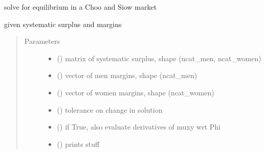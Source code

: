\documentclass[letterpaper,10pt,english]{sphinxmanual}
\begin{document}

\begin{fulllineitems}
\label{\detokenize{ipfp_solvers:ipfp_solvers.ipfp_homo_solver}}
solve for equilibrium in a Choo and Siow market

given systematic surplus and margins
\begin{quote}\begin{description}
\item[{Parameters}] \leavevmode\begin{itemize}
\item {} 
 () \textendash{} matrix of systematic surplus, shape (ncat\_men, ncat\_women)

\item {} 
 () \textendash{} vector of men margins, shape (ncat\_men)

\item {} 
 () \textendash{} vector of women margins, shape (ncat\_women)

\item {} 
 () \textendash{} tolerance on change in solution

\item {} 
 () \textendash{} if True, also evaluate derivatives of muxy wrt Phi

\item {} 
 () \textendash{} prints stuff


\end{itemize}
\end{description}
\end{quote}
\end{fulllineitems}
\end{document}
